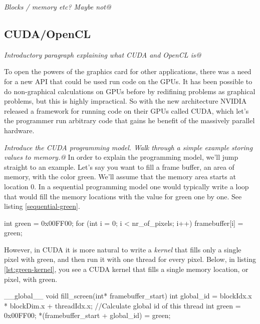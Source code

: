 \documentclass[../main/report.tex]{subfiles}
\begin{document}
\emph{Blocks / memory etc? Maybe not@}



\subsection{CUDA/OpenCL}
\emph{Introductory paragraph explaining what CUDA and OpenCL is@}

To open the powers of the graphics card for other applications, there was a need for a new API that could be
used run code on the GPUs. It has been possible to do non-graphical calculations on GPUs before by 
redifining problems as graphical problems, but this is highly impractical. 
So with the new architecture NVIDIA released a framework for running code on their GPUs called CUDA, 
which let's the programmer run arbitrary code that gains he benefit of the massively parallel hardware.

\emph{Introduce the CUDA programming model. Walk through a simple example storing values to memory.@}
In order to explain the programming model, we'll jump straight to an example.
Let's say you want to fill a frame buffer, an area of memory, with the color green.
We'll assume that the memory area starts at location 0.
In a sequential programming model one would typically write a loop that would fill
the memory locations with the value for green one by one. 
See listing \ref{sequential-green}.

\begin{c-code}[caption=A sequential program filling the screen with green, label=sequential-green]
int green = 0x00FF00;
for (int i = 0; i < nr_of_pixels; i++){
	framebuffer[i] = green;
}
\end{c-code}

However, in CUDA it is more natural to write a \emph{kernel} that fills only a single pixel with green, 
and then run it with one thread for every pixel.
Below, in listing \ref{lst:green-kernel}, 
you see a CUDA kernel that fills a single memory location, or pixel, with green. 

\begin{c-code}[caption=A sequential program filling the screen with green@, label=sequential-green]
__global__ void fill_screen(int* framebuffer_start){
	int global_id = blockIdx.x * blockDim.x + threadIdx.x; //Calculate global id of this thread
	int green     = 0x00FF00;
	*(framebuffer_start + global_id) = green;
}
\end{c-code}
\end{document}
